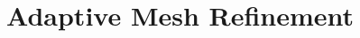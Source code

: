












\section{Adaptive Mesh Refinement}
\frame
{
  \Large
  \begin{block}{}
  \end{block}
}



